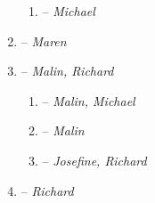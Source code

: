 \begin{enumerate}
\begin{enumerate}[label*=\arabic*.]
	\item {} -- \textit{Michael}
	\end{enumerate}
\item {} -- \textit{Maren}
\item {} -- \textit{Malin, Richard}
	\begin{enumerate}[label*=\arabic*.]
	\item {} -- \textit{Malin, Michael}
	\item {} -- \textit{Malin}
	\item {} -- \textit{Josefine, Richard}
	\end{enumerate}
\item {} -- \textit{Richard}
\end{enumerate}

